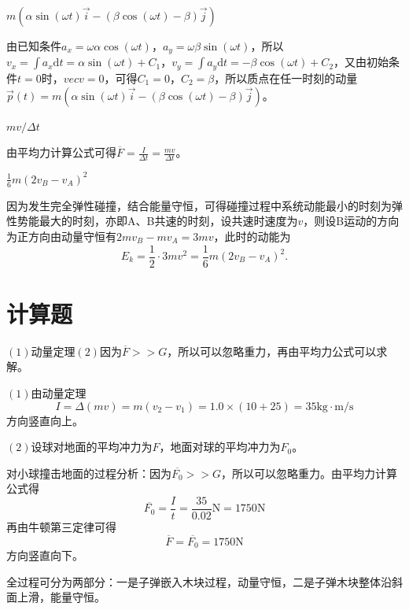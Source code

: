 \documentclass[b5paper,opensource,sourcefont,parskip]{qyxf-book}
\newcommand{\di}[1]{\mathrm{d}#1}
\begin{document}
$m(\alpha\sin(\omega t)\vec{i}-(\beta\cos(\omega t)-\beta)\vec{j})$

\solve 由已知条件$a_x=\omega\alpha\cos(\omega t)，a_y=\omega\beta\sin(\omega t)$，所以$v_x=\int a_x\di t=\alpha\sin(\omega t)+C_1$，$v_y=\int a_y\di t=-\beta\cos(\omega t)+C_2$，又由初始条件$t=0$时，$vec{v}=0$，可得$C_1=0$，$C_2=\beta$，所以质点在任一时刻的动量$\vec{p}(t)=m(\alpha\sin(\omega t)\vec{i}-(\beta\cos(\omega t)-\beta)\vec{j})$。
			
$mv/\Delta t$
			
\solve 由平均力计算公式可得$\overline{F}=\frac{I}{\Delta t}=\frac{mv}{\Delta t}$。

$\frac{1}{6}m(2v_B-v_A)^2$
			
\solve 因为发生完全弹性碰撞，结合能量守恒，可得碰撞过程中系统动能最小的时刻为弹性势能最大的时刻，亦即A、B共速的时刻，设共速时速度为$v$，则设B运动的方向为正方向由动量守恒有$2mv_B-mv_A=3mv$，此时的动能为
\begin{equation*}
E_k=\frac{1}{2}\cdot 3mv^2=\frac{1}{6}m(2v_B-v_A)^2.
\end{equation*}

\section{计算题}

\analysis $(1)$动量定理$(2)$因为$\overline{F}>>G$，所以可以忽略重力，再由平均力公式可以求解。

\solve $(1)$由动量定理
\begin{equation*}
I=\Delta(mv)=m(v_2-v_1)=1.0\times(10+25)=35\mathrm{kg\cdot m/s}
\end{equation*}
方向竖直向上。

$(2)$设球对地面的平均冲力为$F$，地面对球的平均冲力为$F_0$。

对小球撞击地面的过程分析：因为$\overline{F_0}>>G$，所以可以忽略重力。由平均力计算公式得
\begin{equation*}
\overline{F_0}=\frac{I}{t}=\frac{35}{0.02}\mathrm{N}=1750\mathrm{N}
\end{equation*}
再由牛顿第三定律可得
\begin{equation*}
\overline{F}=\overline{F_0}=1750\mathrm{N}
\end{equation*}
方向竖直向下。


\analysis 全过程可分为两部分：一是子弹嵌入木块过程，动量守恒，二是子弹木块整体沿斜面上滑，能量守恒。
\end{document}
